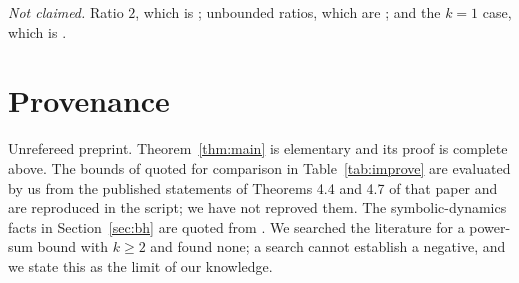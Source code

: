\documentclass[11pt]{article}
\theoremstyle{plain}
\theoremstyle{remark}
\begin{document}
\emph{Not claimed.} Ratio $2$, which is \cite{BF99}; unbounded ratios, which are
\cite{NM03}; and the $k=1$ case, which is \cite{Ben20ELA}.

\section*{Provenance}

Unrefereed preprint. Theorem~\ref{thm:main} is elementary and its proof is complete above.
The bounds of \cite{Ben20ELA} quoted for comparison in Table~\ref{tab:improve} are
evaluated by us from the published statements of Theorems 4.4 and 4.7 of that paper and are
reproduced in the script; we have not reproved them. The symbolic-dynamics facts in
Section~\ref{sec:bh} are quoted from \cite{LM95,BH91,KOR00}. We searched the literature for
a power-sum bound with $k\ge2$ and found none; a search cannot establish a negative, and we
state this as the limit of our knowledge.
\end{document}
